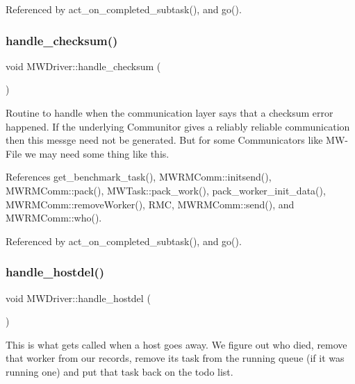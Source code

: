 Referenced by act\+\_\+on\+\_\+completed\+\_\+subtask(), and go().

\mbox{\label{classMWDriver_a7b1d0f044688941bd9a0e502b48c4676}} 
\subsubsection{\texorpdfstring{handle\+\_\+checksum()}{handle\_checksum()}}
{\footnotesize\ttfamily void M\+W\+Driver\+::handle\+\_\+checksum (\begin{DoxyParamCaption}{ }\end{DoxyParamCaption})\hspace{0.3cm}{\ttfamily [virtual]}}

Routine to handle when the communication layer says that a checksum error happened. If the underlying Communitor gives a reliably reliable communication then this messge need not be generated. But for some Communicators like M\+W-\/\+File we may need some thing like this. 

References get\+\_\+benchmark\+\_\+task(), M\+W\+R\+M\+Comm\+::initsend(), M\+W\+R\+M\+Comm\+::pack(), M\+W\+Task\+::pack\+\_\+work(), pack\+\_\+worker\+\_\+init\+\_\+data(), M\+W\+R\+M\+Comm\+::remove\+Worker(), R\+MC, M\+W\+R\+M\+Comm\+::send(), and M\+W\+R\+M\+Comm\+::who().



Referenced by act\+\_\+on\+\_\+completed\+\_\+subtask(), and go().

\mbox{\label{classMWDriver_af6c437b207bd8d327ceb84c5ce0c4304}} 
\subsubsection{\texorpdfstring{handle\+\_\+hostdel()}{handle\_hostdel()}}
{\footnotesize\ttfamily void M\+W\+Driver\+::handle\+\_\+hostdel (\begin{DoxyParamCaption}{ }\end{DoxyParamCaption})\hspace{0.3cm}{\ttfamily [virtual]}}

This is what gets called when a host goes away. We figure out who died, remove that worker from our records, remove its task from the running queue (if it was running one) and put that task back on the todo list. 

